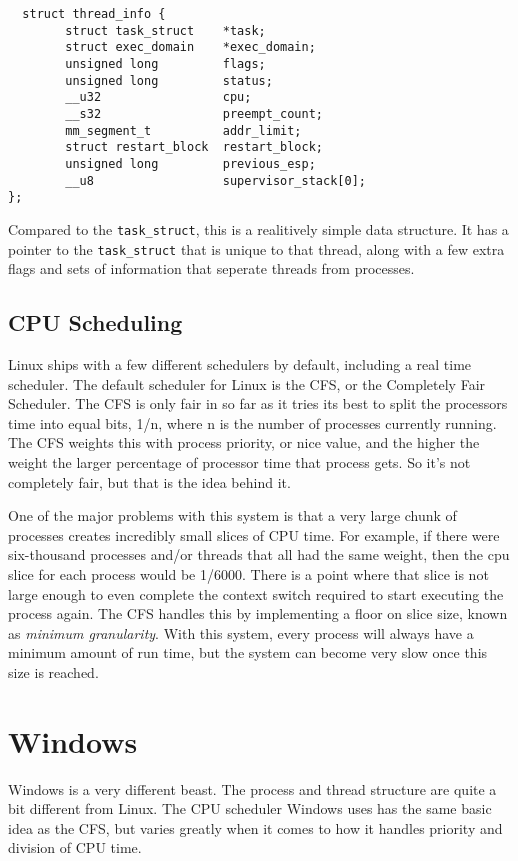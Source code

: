 \begin{lstlisting}
  struct thread_info {
        struct task_struct    *task;
        struct exec_domain    *exec_domain;
        unsigned long         flags;
        unsigned long         status;
        __u32                 cpu;
        __s32                 preempt_count;
        mm_segment_t          addr_limit;
        struct restart_block  restart_block;
        unsigned long         previous_esp;
        __u8                  supervisor_stack[0];
};
\end{lstlisting}

Compared to the \texttt{task\_struct}, this is a realitively simple data structure.
It has a pointer to the \texttt{task\_struct} that is unique to that thread,
along with a few extra flags and sets of information that seperate threads from
processes.

  \subsection{CPU Scheduling}
Linux ships with a few different schedulers by default, including a real time
scheduler.\cite{redhat2016} The default scheduler for Linux is the CFS, or
the Completely Fair Scheduler.
The CFS is only fair in so far as it tries its best to split the processors time
into equal bits, 1/n, where n is the number of processes currently running. The
CFS weights this with process priority, or nice value, and the higher the weight
the larger percentage of processor time that process gets. So it's not completely
fair, but that is the idea behind it.

One of the major problems with this system is that a very large chunk of processes
creates incredibly small slices of CPU time. For example, if there were six-thousand
processes and/or threads that all had the same weight, then the cpu slice for
each process would be 1/6000. There is a point where that slice is not large
enough to even complete the context switch required to start executing the process
again. The CFS handles this by implementing a floor on slice size, known as
\textit{minimum granularity}.\cite{robertlove2010} With this system, every process
will always have a minimum amount of run time, but the system can become very
slow once this size is reached.


\section{Windows}
Windows is a very different beast. The process and thread structure are quite a
bit different from Linux. The CPU scheduler Windows uses has the same basic idea
as the CFS, but varies greatly when it comes to how it handles priority and division
of CPU time.
